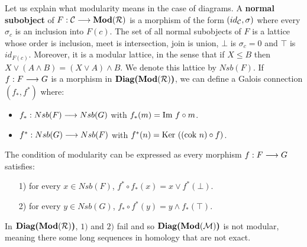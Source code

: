 Let us explain what modularity means in the case of diagrams. A \textbf{normal subobject} of $F : \mathcal{C} \longrightarrow \textbf{Mod}(\mathcal{R})$ is a morphism of the form $(id_{\mathcal{C}},\sigma)$ where every $\sigma_c$ is an inclusion into $F(c)$. The set of all normal subobjects of $F$ is a lattice whose order is inclusion, meet is intersection, join is union, $\bot$ is $\sigma_c = 0$ and $\top$ is $id_{F(c)}$. Moreover, it is a modular lattice, in the sense that if $X \leq B$ then $X \vee (A\wedge B) = (X\vee A)\wedge B$. We denote this lattice by $Nsb(F)$. If $f : F \longrightarrow G$ is a morphism in $\textbf{Diag(}\textbf{Mod}(\mathcal{R})\textbf{)}$, we can define a Galois connection $(f_*,f^*)$ where:
\begin{itemize}
	\item $f_* : Nsb(F) \longrightarrow Nsb(G)$  with $f_*(m) = \text{Im }f\circ m$.
	\item $f^* : Nsb(G) \longrightarrow Nsb(F)$  with $f^*(n) = \text{Ker }((\text{cok }n)\circ f)$.
\end{itemize}
The condition of modularity can be expressed as every morphism $f : F \longrightarrow G$ satisfies:
\begin{itemize}
	\item[1)] for every $x \in Nsb(F)$, $f^*\circ f_*(x) = x \vee f^*(\bot)$.
	\item[2)] for every $y \in Nsb(G)$, $f_*\circ f^*(y) = y \wedge f_*(\top)$.
\end{itemize}
	
	\begin{prop}
In $\textbf{Diag(}\textbf{Mod}(\mathcal{R})\textbf{)}$, $1)$ and $2)$ fail and so $\textbf{Diag(}\textbf{Mod}(\mathcal{M})\textbf{)}$ is not modular, meaning there some long sequences in homology that are not exact.
\end{prop}

